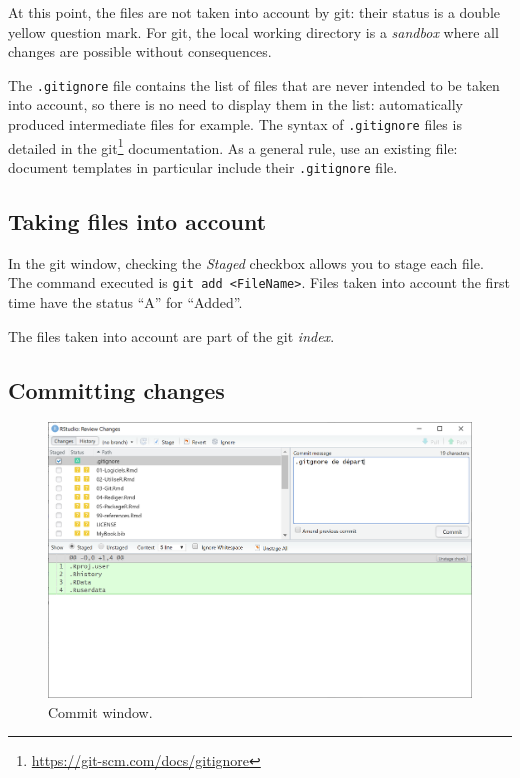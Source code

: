 \documentclass[
  12pt,
  american,
  a4paper,
  extrafontsizes,onecolumn,openright
  ]{memoir}
\begin{document}
\normalsize

At this point, the files are not taken into account by git: their status is a double yellow question mark.
For git, the local working directory is a \emph{sandbox} where all changes are possible without consequences.

The \texttt{.gitignore} file contains the list of files that are never intended to be taken into account, so there is no need to display them in the list: automatically produced intermediate files for example.
The syntax of \texttt{.gitignore} files is detailed in the git\footnote{\url{https://git-scm.com/docs/gitignore}} documentation.
As a general rule, use an existing file: document templates in particular include their \texttt{.gitignore} file.

\subsection{Taking files into account}\label{taking-files-into-account}

In the git window, checking the \emph{Staged} checkbox allows you to stage each file.
The command executed is \texttt{git\ add\ \textless{}FileName\textgreater{}}.
Files taken into account the first time have the status \enquote{A} for \enquote{Added}.

The files taken into account are part of the git \emph{index}.

\subsection{Committing changes}\label{committing-changes}



\scriptsize

\begin{figure}

{\centering \includegraphics[width=0.8\linewidth]{images/git-Commit} 

}

\caption{Commit window.}\label{fig:git-Commit}
\end{figure}
\end{document}
